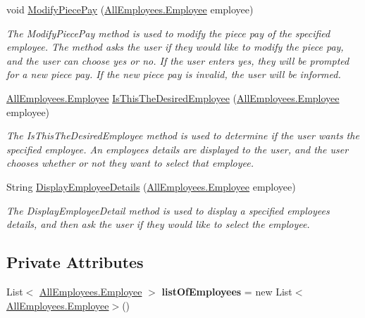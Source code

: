 \begin{DoxyCompactItemize}
void \hyperlink{class_the_company_1_1_container_ae080e1e6827c4525fb0aee041bf5d5b3}{Modify\+Piece\+Pay} (\hyperlink{class_all_employees_1_1_employee}{All\+Employees.\+Employee} employee)
\begin{DoxyCompactList}\small\item\em The Modify\+Piece\+Pay method is used to modify the piece pay of the specified employee. The method asks the user if they would like to modify the piece pay, and the user can choose yes or no. If the user enters yes, they will be prompted for a new piece pay. If the new piece pay is invalid, the user will be informed. \end{DoxyCompactList}\item 
\hyperlink{class_all_employees_1_1_employee}{All\+Employees.\+Employee} \hyperlink{class_the_company_1_1_container_a3f8038abb67c0cec90747c0f4410a2fa}{Is\+This\+The\+Desired\+Employee} (\hyperlink{class_all_employees_1_1_employee}{All\+Employees.\+Employee} employee)
\begin{DoxyCompactList}\small\item\em The Is\+This\+The\+Desired\+Employee method is used to determine if the user wants the specified employee. An employee\textquotesingle{}s details are displayed to the user, and the user chooses whether or not they want to select that employee. \end{DoxyCompactList}\item 
String \hyperlink{class_the_company_1_1_container_a7d0ce158e13ecc9f5d1e53700d82f354}{Display\+Employee\+Details} (\hyperlink{class_all_employees_1_1_employee}{All\+Employees.\+Employee} employee)
\begin{DoxyCompactList}\small\item\em The Display\+Employee\+Detail method is used to display a specified employee\textquotesingle{}s details, and then ask the user if they would like to select the employee. \end{DoxyCompactList}\end{DoxyCompactItemize}
\subsection*{Private Attributes}
\begin{DoxyCompactItemize}
\item 
\hypertarget{class_the_company_1_1_container_a8011678e9e4b50803f94e1f011f64826}{}List$<$ \hyperlink{class_all_employees_1_1_employee}{All\+Employees.\+Employee} $>$ {\bfseries list\+Of\+Employees} = new List$<$\hyperlink{class_all_employees_1_1_employee}{All\+Employees.\+Employee}$>$()\label{class_the_company_1_1_container_a8011678e9e4b50803f94e1f011f64826}

\end{DoxyCompactItemize}


